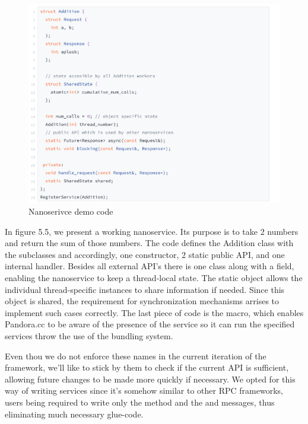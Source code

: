 \begin{figure}[H]
\includegraphics[width=1\linewidth]{content/fig/addition-service.png}
\caption{Nanoserivce demo code}
\end{figure}

In figure 5.5, we present a working  nanoservice. Its purpose is to take 2 numbers and return the sum of those numbers. The code defines the Addition class with the subclasses  and  accordingly, one constructor, 2 static public API, and one internal handler. Besides all external API's there is one  class along with a  field, enabling the nanoservice to keep a thread-local state. The  static object allows the individual thread-specific instances to share information if needed. Since this object is shared, the requirement for synchronization mechanisms arrises to implement such cases correctly. The last piece of code is the  macro, which enables Pandora.cc to be aware of the presence of the service so it can run the specified services throw the use of the bundling system.
 
Even thou we do not enforce these names in the current iteration of the framework, we'll like to stick by them to check if the current API is sufficient, allowing future changes to be made more quickly if necessary. We opted for this way of writing services since it's somehow similar to other RPC frameworks, users being required to write only the  method and the  and  messages, thus eliminating much necessary glue-code. 

